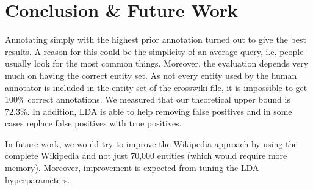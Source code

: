 \documentclass[a4paper,10pt,twocolumn]{article}
\begin{document}
\section{Conclusion \& Future Work}
Annotating simply with the highest prior annotation turned out to give the best results. A reason for this could be the simplicity of an average query, i.e. people usually look for the most common things. Moreover, the evaluation depends very much on having the correct entity set. As not every entity used by the human annotator is included in the entity set of the crosswiki file, it is impossible to get 100\% correct annotations. We measured that our theoretical upper bound is 72.3\%. In addition, LDA is able to help removing false positives and in some cases replace false positives with true positives.

In future work, we would try to improve the Wikipedia approach by using the complete Wikipedia and not just 70,000 entities (which would require more memory). Moreover, improvement is expected from tuning the LDA hyperparameters.



\end{document}
